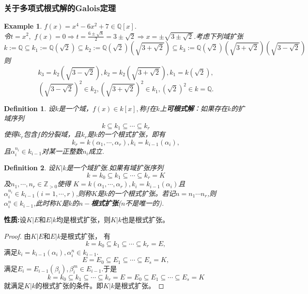 \documentclass[UTF8]{article}
\newtheorem{defn}{Definition}[section]
\newtheorem{exa}{Example}[section]
\begin{document}
\subsubsection{关于多项式根式解的Galois定理}
\begin{exa}
$f(x)=x^{4}-6x^{2}+7\in \mathbb{Q}[x].$\\
令$t=x^{2},$ $f(x)=0\Rightarrow t=\frac{6\pm\sqrt{8}}{2}=3\pm \sqrt{2}\Rightarrow x=\pm\sqrt{3\pm \sqrt{2}}$.考虑下列域扩张
$$
k:=\mathbb{Q}\subseteq k_{1}:=\mathbb{Q}(\sqrt{2})\subseteq k_{2}:=\mathbb{Q}(\sqrt{2})(\sqrt{3+\sqrt{2}})\subseteq k_{3}:=\mathbb{Q}(\sqrt{2})(\sqrt{3+\sqrt{2}})(\sqrt{3-\sqrt{2}})
$$
则
$$k_{3}=k_{2}(\sqrt{3-\sqrt{2}}),k_{2}=k_{2}(\sqrt{3+\sqrt{2}}),k_{1}=k(\sqrt{2}),$$
$$
(\sqrt{3-\sqrt{2}})^{2}\in k_{2},(\sqrt{3+\sqrt{2}})^{2}\in k_{1},(\sqrt{2})^{2}\in k=\mathbb{Q}.
$$
\end{exa}
\begin{defn}
设$k$是一个域，$f(x)\in k[x],$称$f$在$k$上\textbf{可根式解}：如果存在$k$的扩域序列
$$
k\subseteq k_{1}\subseteq \cdots\subseteq k_{r}
$$
使得$k_{r}$包含$f$的分裂域，且$k_{r}$是$k$的一个根式扩张，即有$$k_{r}=k(\alpha_{1},\cdots,\alpha_{r}),k_{i}=k_{i-1}(\alpha_{i}),$$
且$\alpha_{i}^{n_{i}}\in k_{i-1}$对某一正整数$n_{i}$成立.
\end{defn}
\begin{defn}
设$K|k$是一个域扩张.如果有域扩张序列
$$
k=k_{0}\subseteq k_{1}\subseteq \cdots\subseteq k_{r}=K
$$
及$n_{1},\cdots,n_{r}\in \mathbb{Z}_{>0}$使得
$K=k(\alpha_{1},\cdots,\alpha_{r}),k_{i}=k_{i-1}(\alpha_{i})$且$\alpha_{i}^{n_{i}}\in k_{i-1}(i=1,\cdots,r)$,则称$K$是$k$的一个根式扩张。若记$n=n_{1}\cdots n_{r}$,则
$\alpha_{i}^{n}\in k_{i-1}$,此时称$K$是$k$的$n-$\textbf{根式扩张}($n$不是唯一的).
\end{defn}

\textbf{性质:}设$K|E$和$E|k$均是根式扩张，则$K|k$也是根式扩张。
\begin{proof}
	由$K|E$和$E|k$是根式扩张，
	有
	$$
	k=k_{0}\subseteq k_{1}\subseteq \cdots\subseteq k_{r}=E,
	$$
	满足$k_{i}=k_{i-1}(\alpha_{i}),\alpha_{i}^{n}\in k_{i-1}.$
	$$
	E=E_{0}\subseteq E_{1}\subseteq \cdots\subseteq E_{s}=K,
	$$
	满足$E_{i}=E_{i-1}(\beta_{i}),\beta_{i}^{m}\in E_{i-1}.$于是
	$$
	k=k_{0}\subseteq k_{1}\subseteq \cdots\subseteq k_{r}=E=E_{0}\subseteq E_{1}\subseteq \cdots\subseteq E_{s}=K
	$$
	就满足$K|k$的根式扩张的条件。即$K|k$是根式扩张。
\end{proof}
\end{document}

